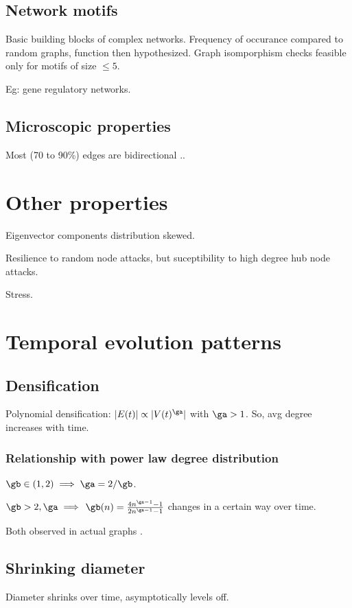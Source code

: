\documentclass[oneside, article]{memoir}
\begin{document}
\subsection{Network motifs}
Basic building blocks of complex networks. Frequency of occurance compared to random graphs, function then hypothesized. Graph isomporphism checks feasible only for motifs of size $\leq 5$.

Eg: gene regulatory networks.

\subsection{Microscopic properties}
Most (70 to 90\%) edges are bidirectional \cite{leskovecThesis}..

\section{Other properties}
Eigenvector components distribution skewed.

Resilience to random node attacks, but suceptibility to high degree hub node attacks.

Stress.

\section{Temporal evolution patterns}

\subsection{Densification}
Polynomial densification: $|E(t)| \propto |V(t)^{\ga}|$ with $\ga >1$. So, avg degree increases with time.

\subsubsection{Relationship with power law degree distribution}
$\gb \in (1,2) \implies \ga = 2/\gb$.

$\gb >2, \ga \implies$ $\gb(n) = \frac{4n^{\ga-1}-1}{2n^{\ga-1}-1}$ changes in a certain way over time.

Both observed in actual graphs \cite{leskovecThesis}.


\subsection{Shrinking diameter}
Diameter shrinks over time, asymptotically levels off.
\end{document}
